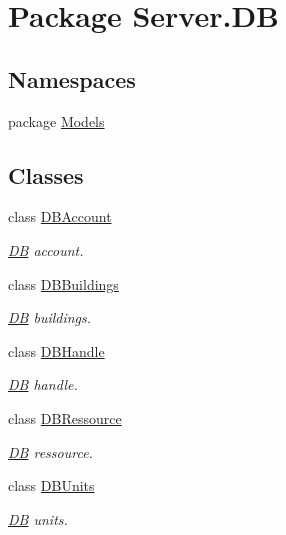 \hypertarget{namespaceServer_1_1DB}{\section{Package Server.\-D\-B}
\label{namespaceServer_1_1DB}
}
\subsection*{Namespaces}
\begin{DoxyCompactItemize}
\item 
package \hyperlink{namespaceServer_1_1DB_1_1Models}{Models}
\end{DoxyCompactItemize}
\subsection*{Classes}
\begin{DoxyCompactItemize}
\item 
class \hyperlink{classServer_1_1DB_1_1DBAccount}{D\-B\-Account}
\begin{DoxyCompactList}\small\item\em \hyperlink{namespaceServer_1_1DB}{D\-B} account. \end{DoxyCompactList}\item 
class \hyperlink{classServer_1_1DB_1_1DBBuildings}{D\-B\-Buildings}
\begin{DoxyCompactList}\small\item\em \hyperlink{namespaceServer_1_1DB}{D\-B} buildings. \end{DoxyCompactList}\item 
class \hyperlink{classServer_1_1DB_1_1DBHandle}{D\-B\-Handle}
\begin{DoxyCompactList}\small\item\em \hyperlink{namespaceServer_1_1DB}{D\-B} handle. \end{DoxyCompactList}\item 
class \hyperlink{classServer_1_1DB_1_1DBRessource}{D\-B\-Ressource}
\begin{DoxyCompactList}\small\item\em \hyperlink{namespaceServer_1_1DB}{D\-B} ressource. \end{DoxyCompactList}\item 
class \hyperlink{classServer_1_1DB_1_1DBUnits}{D\-B\-Units}
\begin{DoxyCompactList}\small\item\em \hyperlink{namespaceServer_1_1DB}{D\-B} units. \end{DoxyCompactList}\end{DoxyCompactItemize}
